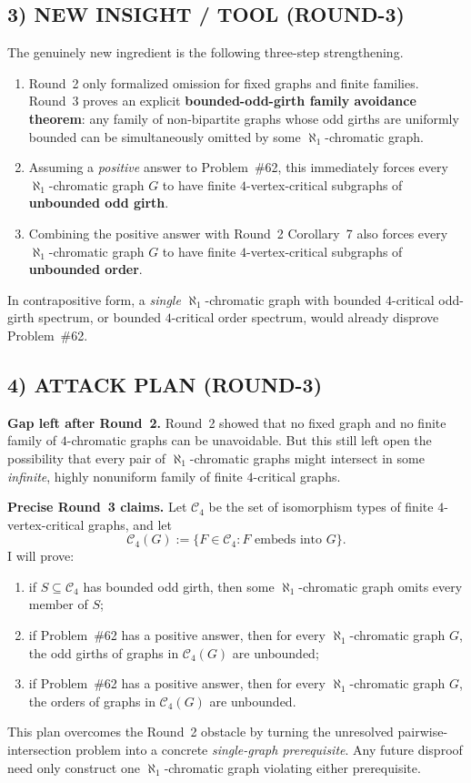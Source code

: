 \subsection*{3) NEW INSIGHT / TOOL (ROUND-3)}
The genuinely new ingredient is the following three-step strengthening.
\begin{enumerate}
\item Round~2 only formalized omission for fixed graphs and finite families. Round~3 proves an explicit \textbf{bounded-odd-girth family avoidance theorem}: any family of non-bipartite graphs whose odd girths are uniformly bounded can be simultaneously omitted by some $\aleph_1$-chromatic graph.
\item Assuming a \emph{positive} answer to Problem~\#62, this immediately forces every $\aleph_1$-chromatic graph $G$ to have finite $4$-vertex-critical subgraphs of \textbf{unbounded odd girth}.
\item Combining the positive answer with Round~2 Corollary~7 also forces every $\aleph_1$-chromatic graph $G$ to have finite $4$-vertex-critical subgraphs of \textbf{unbounded order}.
\end{enumerate}
In contrapositive form, a \emph{single} $\aleph_1$-chromatic graph with bounded $4$-critical odd-girth spectrum, or bounded $4$-critical order spectrum, would already disprove Problem~\#62.

\subsection*{4) ATTACK PLAN (ROUND-3)}
\textbf{Gap left after Round~2.}
Round~2 showed that no fixed graph and no finite family of $4$-chromatic graphs can be unavoidable. But this still left open the possibility that every pair of $\aleph_1$-chromatic graphs might intersect in some \emph{infinite}, highly nonuniform family of finite $4$-critical graphs.

\textbf{Precise Round~3 claims.}
Let $\mathcal C_4$ be the set of isomorphism types of finite $4$-vertex-critical graphs, and let
\[
\mathcal C_4(G):=\{F\in \mathcal C_4 : F\text{ embeds into }G\}.
\]
I will prove:
\begin{enumerate}
\item if $S\subseteq \mathcal C_4$ has bounded odd girth, then some $\aleph_1$-chromatic graph omits every member of $S$;
\item if Problem~\#62 has a positive answer, then for every $\aleph_1$-chromatic graph $G$, the odd girths of graphs in $\mathcal C_4(G)$ are unbounded;
\item if Problem~\#62 has a positive answer, then for every $\aleph_1$-chromatic graph $G$, the orders of graphs in $\mathcal C_4(G)$ are unbounded.
\end{enumerate}
This plan overcomes the Round~2 obstacle by turning the unresolved pairwise-intersection problem into a concrete \emph{single-graph prerequisite}. Any future disproof need only construct one $\aleph_1$-chromatic graph violating either prerequisite.

